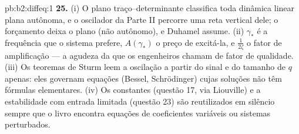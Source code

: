 \begin{solution}{pb:b2:diffeq:1}
\textbf{25.} (i) O plano traço--determinante classifica toda
dinâmica linear plana autônoma, e o oscilador da Parte II
percorre uma reta vertical dele; o forçamento deixa o plano
(não autônomo), e Duhamel assume. (ii) $\gamma_*$ é
a frequência que o sistema prefere, $A(\gamma_*)$ o preço de
excitá-la, e $\frac{1}{2\zeta}$ o fator de amplificação
--- a agudeza da  que os engenheiros chamam de fator
de qualidade. (iii) Os teoremas de Sturm leem a oscilação a partir do sinal
e do tamanho de $q$ apenas: eles governam equações (Bessel,
Schrödinger) cujas soluções não têm fórmulas elementares.
(iv) Os  constantes (questão 17, via Liouville) e
a estabilidade com entrada limitada (questão 23) são reutilizados em silêncio
sempre que o livro encontra equações de coeficientes variáveis ou
sistemas perturbados.
\end{solution}
